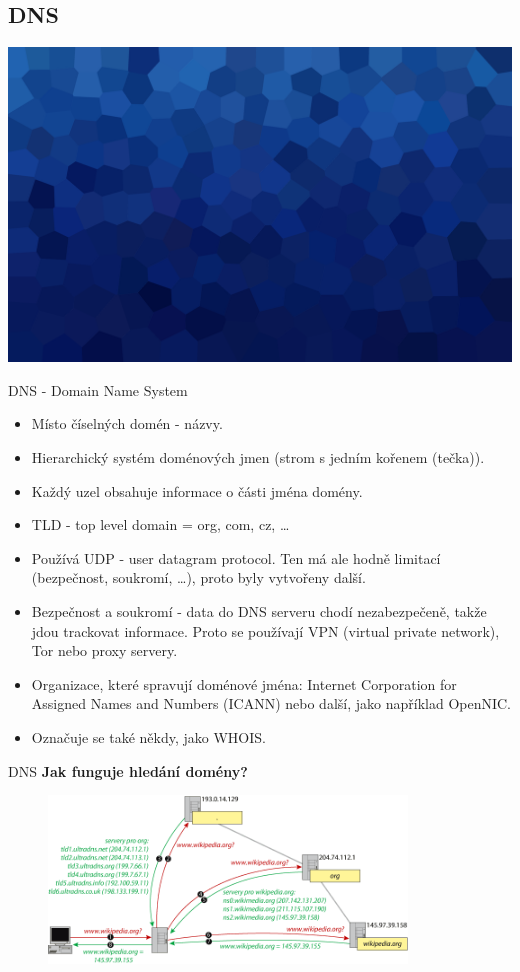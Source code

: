 \documentclass[aspectratio=169,xcolor=dvipsnames, t]{beamer}
\begin{document}
\subsection{DNS}
{
    \includegraphics[width=\paperwidth,height=\paperheight]{AICStyleData/logos/mene_polygonu_bg.png}
}
\begin{frame}{DNS - Domain Name System}
    \begin{itemize}
        \item Místo číselných domén - názvy.
        \item Hierarchický systém doménových jmen (strom s jedním kořenem (tečka)).
        \item Každý uzel obsahuje informace o části jména domény.
        \item TLD - top level domain = org, com, cz, \ldots
        \item Používá UDP - user datagram protocol. Ten má ale hodně limitací (bezpečnost, soukromí, \ldots), proto byly vytvořeny další.
        \item Bezpečnost a soukromí - data do DNS serveru chodí nezabezpečeně, takže jdou trackovat informace. Proto se používají VPN (virtual private network), Tor nebo proxy servery.
        \item Organizace, které spravují doménové jména:  Internet Corporation for Assigned Names and Numbers (ICANN) nebo další, jako například OpenNIC.
        \item Označuje se také někdy, jako WHOIS.
    \end{itemize}
\end{frame}
\begin{frame}{DNS}
    \vspace{-0.5cm}
    \textbf{\Large Jak funguje hledání domény?}
    \begin{figure}
        \centering
        \includegraphics[width=0.85\textwidth]{dns}
    \end{figure}
\end{frame}
\makefinalpage
\end{document}
